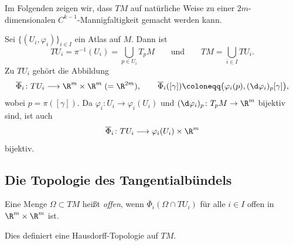\documentclass[11pt]{article}
\begin{document}
Im Folgenden zeigen wir, dass $TM$ auf natürliche Weise zu einer $2m$-dimensionalen $C^{k-1}$-Mannigfaltigkeit gemacht werden kann.

Sei $\{(U_i, \varphi_i)\}_{i \in I}$ ein Atlas auf $M$. Dann ist
\[ TU_i = \pi^{-1}(U_i) = \bigcup_{p \in U_i} T_p M \qquad \text{und} \qquad TM = \bigcup_{i \in I} TU_i. \]
Zu $TU_i$ gehört die Abbildung
\[ \overline{\Phi}_i \colon TU_i \longrightarrow \R^m \times \R^m \;(= \R^{2m}), \qquad \overline{\Phi}_i([\gamma]) \coloneqq \bigl(\varphi_i(p), (\d\varphi_i)_p [\gamma]\bigr), \]
wobei $p = \pi([\gamma])$. Da $\varphi_i \colon U_i \to \varphi_i(U_i)$ und $(\d\varphi_i)_p \colon T_p M \to \R^m$ bijektiv sind, ist auch
\[ \overline{\Phi}_i \colon TU_i \longrightarrow \varphi_i(U_i) \times \R^m \]
bijektiv.


\subsection{Die Topologie des Tangentialbündels}

\begin{definition}\Theorem
  Eine Menge $\Omega \subset TM$ heißt \emph{offen}, wenn $\overline{\Phi}_i(\Omega \cap TU_i)$ für alle $i \in I$ offen in $\R^m \times \R^m$ ist.
\end{definition}


\begin{lemma}\Theorem
  Dies definiert eine Hausdorff-Topologie auf $TM$.
\end{lemma}
\end{document}
